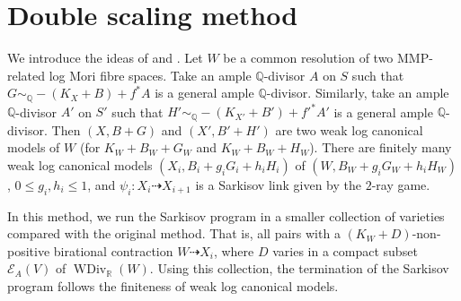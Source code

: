 \documentclass[11pt]{amsart}
\begin{document}
\section{Double scaling method}
We introduce the ideas of \cite[\S 13]{haconMinimalModelProgram2012} and  \cite{liuSarkisovProgramGeneralized2021}.
Let $W$ be a common resolution of two MMP-related log Mori fibre spaces. Take an ample $\mathbb{Q}$-divisor $A$ on $S$ such that $G \sim_\mathbb{Q} -(K_{X}+B) +f^*A$  is a general ample $\mathbb{Q}$-divisor. Similarly, take an ample $\mathbb{Q}$-divisor $A'$ on $S'$ such that $H' \sim_\mathbb{Q} -(K_{X'}+B') +f'^*A'$  is a general ample $\mathbb{Q}$-divisor. Then  $(X,B+G)$ and $(X',B'+H')$ are two weak log canonical models of $W$ (for $K_{W}+B_{W}+G_{W}$ and $K_{W}+B_{W}+H_{W}$). There are finitely many weak log canonical models $(X_{i},B_{i}+g_{i}G_{i}+h_{i}H_{i})$ of $(W,B_{W}+g_{i}G_{W}+h_{i}H_{W})$, $0\leqslant g_i,h_i\leqslant 1$, and $\psi_{i}:X_{i}\dashrightarrow X_{i+1}$ is a Sarkisov link given by the $2$-ray game.

In this method, we run the Sarkisov program in a smaller collection of varieties compared with the original method. That is, all pairs with a $(K_{W}+D)$-non-positive birational contraction $W\dashrightarrow X_{i}$, where $D$ varies in a compact subset $\mathcal{E}_{A}(V)$ of $\operatorname{WDiv}_{\mathbb{R}}(W)$. Using this collection, the termination of the Sarkisov program follows the finiteness of weak log canonical models.
\end{document}
